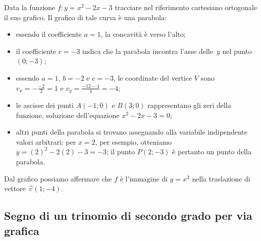 \begin{exrig}
\begin{esempio}
Data la funzione $f: y=x^2-2x-3$ tracciare nel riferimento cartesiano ortogonale il suo grafico.
Il grafico di tale curva è una parabola:
\begin{itemize}
\item essendo il coefficiente $a=1$, la concavità è verso l'alto;
\item il coefficiente $c=-3$ indica che la parabola incontra l'asse delle~$y$ nel punto $(0;-3)$;
\item essendo $a=1$, $b=-2$ e $c=-3$, le coordinate del vertice $V$ sono $v_x=-\frac{-2} 2=1$ e $v_y=\frac{-12-4} 4=-4$;
\item le ascisse dei punti $A(-1;0)$ e $B(3;0)$ rappresentano gli zeri della funzione, soluzione dell'equazione $x^2-2x-3=0$;
\item altri punti della parabola si trovano assegnando alla variabile indipendente valori arbitrari: per $x=2$, per esempio, otteniamo $y=(2)^2-2(2)-3=-3$; il punto $P(2;-3)$ è pertanto un punto della parabola.
\end{itemize}
Dal grafico possiamo affermare che $f$ è l'immagine di $y=x^2$ nella traslazione di vettore $\vec v(1;-4)$.
\begin{center}
 
\end{center}
\end{esempio}
\end{exrig}
\vspazio\ovalbox{\risolvii \ref{ese:4.6}, \ref{ese:4.7}}

\subsection{Segno di un trinomio di secondo grado per via grafica}

